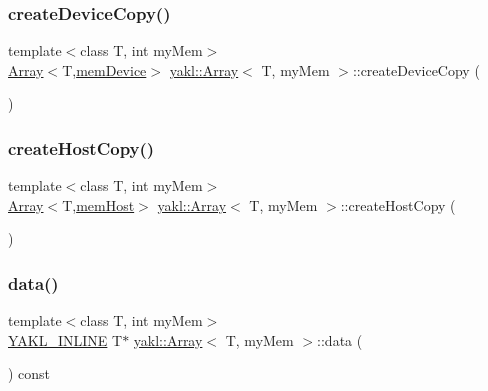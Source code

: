 \mbox{\label{classyakl_1_1Array_ace2cf939f0d0675c66b3a15429dc2d4c}} 
\subsubsection{\texorpdfstring{create\+Device\+Copy()}{createDeviceCopy()}}
{\footnotesize\ttfamily template$<$class T, int my\+Mem$>$ \\
\hyperlink{classyakl_1_1Array}{Array}$<$T,\hyperlink{namespaceyakl_ac3c32aec58c61e7f870081477ceee883}{mem\+Device}$>$ \hyperlink{classyakl_1_1Array}{yakl\+::\+Array}$<$ T, my\+Mem $>$\+::create\+Device\+Copy (\begin{DoxyParamCaption}{ }\end{DoxyParamCaption})\hspace{0.3cm}{\ttfamily [inline]}}

\mbox{\label{classyakl_1_1Array_a1f97f8b19063220b5a129ee8c90eccac}} 
\subsubsection{\texorpdfstring{create\+Host\+Copy()}{createHostCopy()}}
{\footnotesize\ttfamily template$<$class T, int my\+Mem$>$ \\
\hyperlink{classyakl_1_1Array}{Array}$<$T,\hyperlink{namespaceyakl_aae8a8c910fec7cef7db68c9658c16405}{mem\+Host}$>$ \hyperlink{classyakl_1_1Array}{yakl\+::\+Array}$<$ T, my\+Mem $>$\+::create\+Host\+Copy (\begin{DoxyParamCaption}{ }\end{DoxyParamCaption})\hspace{0.3cm}{\ttfamily [inline]}}

\mbox{\label{classyakl_1_1Array_a0be3f0f935a149d00530d92a1d90a222}} 
\subsubsection{\texorpdfstring{data()}{data()}}
{\footnotesize\ttfamily template$<$class T, int my\+Mem$>$ \\
\hyperlink{YAKL_8h_aa0dd629ffce6d564b19e9313fb91a5ad}{Y\+A\+K\+L\+\_\+\+I\+N\+L\+I\+NE} T$\ast$ \hyperlink{classyakl_1_1Array}{yakl\+::\+Array}$<$ T, my\+Mem $>$\+::data (\begin{DoxyParamCaption}{ }\end{DoxyParamCaption}) const\hspace{0.3cm}{\ttfamily [inline]}}

